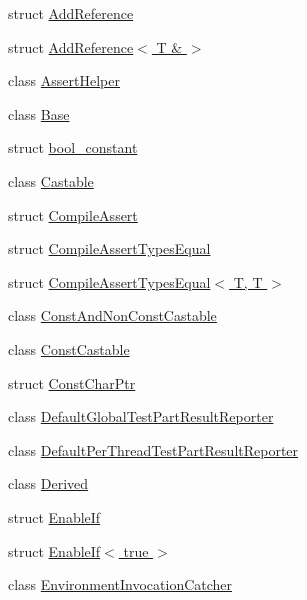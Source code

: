\begin{DoxyCompactItemize}
\item 
struct \hyperlink{structtesting_1_1internal_1_1_add_reference}{Add\+Reference}
\item 
struct \hyperlink{structtesting_1_1internal_1_1_add_reference_3_01_t_01_6_01_4}{Add\+Reference$<$ T \& $>$}
\item 
class \hyperlink{classtesting_1_1internal_1_1_assert_helper}{Assert\+Helper}
\item 
class \hyperlink{classtesting_1_1internal_1_1_base}{Base}
\item 
struct \hyperlink{structtesting_1_1internal_1_1bool__constant}{bool\+\_\+constant}
\item 
class \hyperlink{classtesting_1_1internal_1_1_castable}{Castable}
\item 
struct \hyperlink{structtesting_1_1internal_1_1_compile_assert}{Compile\+Assert}
\item 
struct \hyperlink{structtesting_1_1internal_1_1_compile_assert_types_equal}{Compile\+Assert\+Types\+Equal}
\item 
struct \hyperlink{structtesting_1_1internal_1_1_compile_assert_types_equal_3_01_t_00_01_t_01_4}{Compile\+Assert\+Types\+Equal$<$ T, T $>$}
\item 
class \hyperlink{classtesting_1_1internal_1_1_const_and_non_const_castable}{Const\+And\+Non\+Const\+Castable}
\item 
class \hyperlink{classtesting_1_1internal_1_1_const_castable}{Const\+Castable}
\item 
struct \hyperlink{structtesting_1_1internal_1_1_const_char_ptr}{Const\+Char\+Ptr}
\item 
class \hyperlink{classtesting_1_1internal_1_1_default_global_test_part_result_reporter}{Default\+Global\+Test\+Part\+Result\+Reporter}
\item 
class \hyperlink{classtesting_1_1internal_1_1_default_per_thread_test_part_result_reporter}{Default\+Per\+Thread\+Test\+Part\+Result\+Reporter}
\item 
class \hyperlink{classtesting_1_1internal_1_1_derived}{Derived}
\item 
struct \hyperlink{structtesting_1_1internal_1_1_enable_if}{Enable\+If}
\item 
struct \hyperlink{structtesting_1_1internal_1_1_enable_if_3_01true_01_4}{Enable\+If$<$ true $>$}
\item 
class \hyperlink{classtesting_1_1internal_1_1_environment_invocation_catcher}{Environment\+Invocation\+Catcher}

\end{DoxyCompactItemize}
